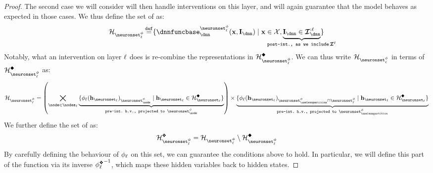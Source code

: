 \begin{proof}
    The second case we will consider will then handle interventions on this layer, and will again guarantee that the model behaves as expected in those cases.
    We thus define the set of  as:
    \begin{align}
        \AllInpIntTransformedActivationsLayer
        \defeq \{\dnnfunclayer{\neuronset_{\layer}^{\causalmap}}(\bx, \interventions_{\dnn}) \mid 
        \bx \in \calX, \underbrace{\interventionsdnn \in \interventionsset_{\dnn}^{:\layer}}_{\!\!\!\!\!\!\!\!\!\!\!\!\!\!\!\!\!\!\!\!\!\!\!\!\texttt{post-int., as we include}\,\interventionsset^{\layer}\!\!\!\!\!\!\!\!\!\!\!\!\!\!\!\!\!\!\!\!\!\!\!\!} \}
    \end{align}
    Notably, what an intervention on layer $\ell$ does is re-combine the representations in $\AllInpIntTransformedActivationsLayerOneH{\layer}$.
    We can thus write $\AllInpIntTransformedActivationsLayer$ in terms of $\AllInpIntTransformedActivationsLayerOneH{\layer}$ as:
    \begin{align}
        \AllInpIntTransformedActivationsLayer
        = \left(\bigtimes_{\node \in \nodes_{\layer}} 
        \underbrace{\{
        \causalmap_{\layer}(\hiddenstates_{\neuronset_{\layer}})_{\neuronset^{\causalmap}_{\node}}
        \mid 
        \hiddenstates_{\neuronset_{\layer}} \in \AllInpIntActivationsLayer \}}_{\texttt{pre-int.\ h.v., projected to }\neuronset^{\causalmap}_{\node}}\right) 
        \times 
        \underbrace{\{\causalmap_{\layer}(\hiddenstates_{\neuronset_{\layer}})_{\neuronset^{\causalmap}_{\uselesspartition} \cap \neuronset^{\causalmap}_{\layer}}
        \mid 
        \hiddenstates_{\neuronset_{\layer}} \in \AllInpIntActivationsLayer \}}_{\texttt{pre-int.\ h.v., projected to }\neuronset^{\causalmap}_{\uselesspartition}}
    \end{align}
    We further define the set of  as:
    \begin{align}
        \AllInpIntTransformedActivationsLayerTwoH{\layer}
        = 
        \AllInpIntTransformedActivationsLayer
        \setminus
        \AllInpIntTransformedActivationsLayerOneH{\layer}
    \end{align}
    By carefully defining the behaviour of $\phi_{\ell}$ on this set, we can guarantee the conditions above to hold.
    In particular, we will define this part of the function via its inverse ${\causalmap_{\layer}^{\inter}}^{-1}$, which maps these hidden variables back to hidden states.

\end{proof}
